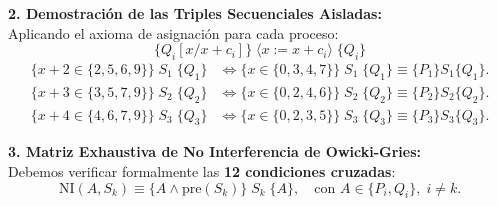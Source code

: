 \documentclass[11pt,a4paper,twoside,openright]{report}
\begin{document}
\begin{solucion}
\textbf{2. Demostración de las Triples Secuenciales Aisladas:}\\
Aplicando el axioma de asignación para cada proceso:
\[
\{Q_i[x/x+c_i]\} \; \langle x := x + c_i \rangle \; \{Q_i\}
\]
\begin{align*}
\{x + 2 \in \{2, 5, 6, 9\}\} \; S_1 \; \{Q_1\} &\iff \{x \in \{0, 3, 4, 7\}\} \; S_1 \; \{Q_1\} \equiv \{P_1\} S_1 \{Q_1\}.\\
\{x + 3 \in \{3, 5, 7, 9\}\} \; S_2 \; \{Q_2\} &\iff \{x \in \{0, 2, 4, 6\}\} \; S_2 \; \{Q_2\} \equiv \{P_2\} S_2 \{Q_2\}.\\
\{x + 4 \in \{4, 6, 7, 9\}\} \; S_3 \; \{Q_3\} &\iff \{x \in \{0, 2, 3, 5\}\} \; S_3 \; \{Q_3\} \equiv \{P_3\} S_3 \{Q_3\}.
\end{align*}

\textbf{3. Matriz Exhaustiva de No Interferencia de Owicki-Gries:}\\
Debemos verificar formalmente las \textbf{12 condiciones cruzadas}:
\[
\text{NI}(A, S_k) \equiv \{A \land \text{pre}(S_k)\} \; S_k \; \{A\}, \quad \text{con } A \in \{P_i, Q_i\}, \; i \ne k.
\]


\end{solucion}
\end{document}
